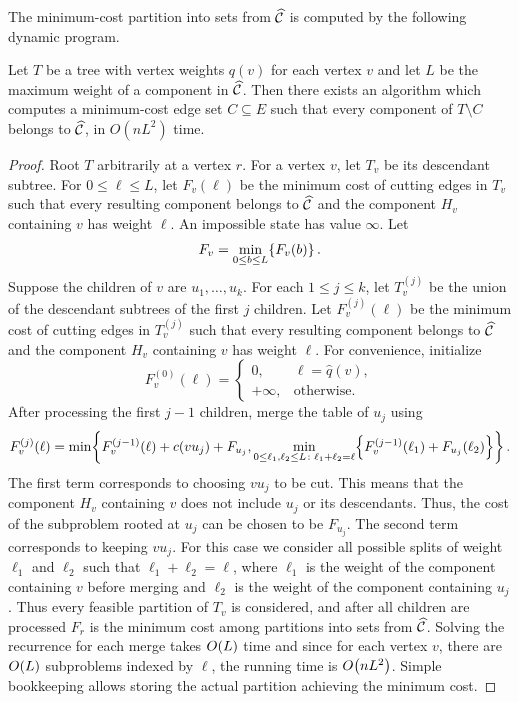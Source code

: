 The minimum-cost partition into sets from $\widehat{\mathcal{C}}$ is computed by the following dynamic program.
\begin{theorem}\label{thm:weighted-budget-dp}
    Let $T$ be a tree with vertex weights $q(v)$ for each vertex $v$ and let $L$ be the maximum weight of a component in $\widehat{\mathcal{C}}$. Then there exists an algorithm which computes a minimum-cost edge set $C\subseteq E$ such that every component of $T\setminus C$ belongs to $\widehat{\mathcal{C}}$, in $O(nL^2)$ time.
\end{theorem}
\begin{proof}

Root $T$ arbitrarily at a vertex $r$. For a vertex $v$, let $T_v$ be its descendant subtree. For $0\leq\ell\leq L$, let $F_v(\ell)$ be the minimum cost of cutting edges in $T_v$ such that every resulting component belongs to $\widehat{\mathcal{C}}$ and the component $H_v$ containing $v$ has weight $\ell$. An impossible state has value $\infty$. Let
\[
    F_v=\min_{0\leq b\leq L}\mathopen{}\left\{ F_v(b) \right\}.
\]
Suppose the children of $v$ are $u_1,\ldots,u_k$. For each $1\leq j\leq k$, let $T_{v}^{(j)}$ be the union of the descendant subtrees of the first $j$ children. Let $F_v^{(j)}(\ell)$ be the minimum cost of cutting edges in $T_{v}^{(j)}$ such that every resulting component belongs to $\widehat{\mathcal{C}}$ and the component $H_v$ containing $v$ has weight $\ell$. For convenience, initialize
\[
    F_v^{(0)}(\ell)
    =\begin{cases}
        0,&\ell=\widehat q(v),\\
        +\infty,&\text{otherwise}.
    \end{cases}
\]
After processing the first $j-1$ children, merge the table of $u_j$ using
\begin{align*}
    F_v^{(j)}(\ell)
    =\min\mathopen{}\left\{ 
        F_v^{(j-1)}(\ell)+c(vu_j)+F_{u_j},
        \min_{0\leq\ell_1,\ell_2\leq L\colon \ell_1+\ell_2=\ell}
        \mathopen{}\left\{ F_v^{(j-1)}(\ell_1)+F_{u_j}(\ell_2) \right\}
     \right\}.
\end{align*}
The first term corresponds to choosing $vu_j$ to be cut. This means that the component $H_v$ containing $v$ does not include $u_j$ or its descendants. Thus, the cost of the subproblem rooted at $u_j$ can be chosen to be $F_{u_j}$. The second term corresponds to keeping $vu_j$. For this case we consider all possible splits of weight $\ell_1$ and $\ell_2$ such that $\ell_1+\ell_2=\ell$, where $\ell_1$ is the weight of the component containing $v$ before merging and $\ell_2$ is the weight of the component containing $u_j$. Thus every feasible partition of $T_v$ is considered, and after all children are processed $F_r$ is the minimum cost among partitions into sets from $\widehat{\mathcal{C}}$. Solving the recurrence for each merge takes $O\mathopen{}\left( L \right)$ time and since for each vertex $v$, there are $O\mathopen{}\left( L \right)$ subproblems indexed by $\ell$, the running time is $O\mathopen{}\left( nL^2 \right)$. Simple bookkeeping allows storing the actual partition achieving the minimum cost.
\end{proof}

